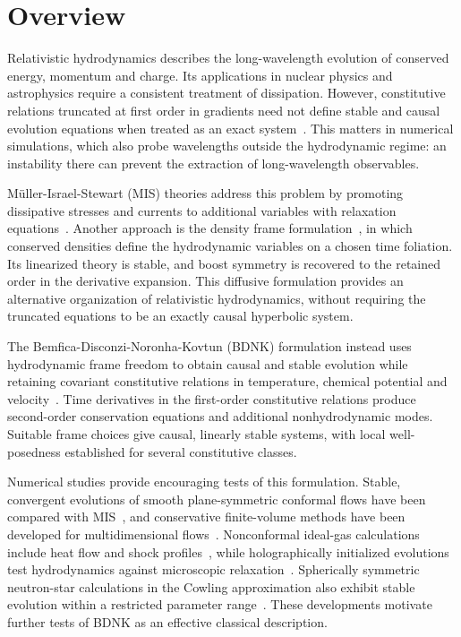 \section{Overview}\label{sec:overview}

Relativistic hydrodynamics describes the long-wavelength evolution of
conserved energy, momentum and charge. Its applications in nuclear physics
and astrophysics require a consistent treatment of dissipation. However,
constitutive relations truncated at first order in gradients need not
define stable and causal evolution equations when treated as an exact
system~\cite{HiscockLindblom}. This matters in numerical simulations, which also probe
wavelengths outside the hydrodynamic regime: an instability there can
prevent the extraction of long-wavelength observables.

M\"uller-Israel-Stewart (MIS) theories address this problem by promoting
dissipative stresses and currents to additional variables with relaxation
equations~\cite{Muller,IsraelStewart}. Another approach is the density frame
formulation~\cite{ArmasJain}, in which conserved densities define the
hydrodynamic variables on a chosen time foliation. Its linearized theory
is stable, and boost symmetry is recovered to the retained order in the
derivative expansion. This diffusive formulation provides an alternative
organization of relativistic hydrodynamics, without requiring the
truncated equations to be an exactly causal hyperbolic system.

The Bemfica-Disconzi-Noronha-Kovtun (BDNK) formulation instead uses
hydrodynamic frame freedom to obtain causal and stable evolution while
retaining covariant constitutive relations in temperature, chemical
potential and velocity~\cite{BDN2018,Kovtun2019,BDN2019,HoultKovtun,BDN2022}.
Time derivatives in the first-order constitutive relations produce
second-order conservation equations and additional nonhydrodynamic modes.
Suitable frame choices give causal, linearly stable systems, with local well-posedness established
for several constitutive classes.

Numerical studies provide encouraging tests of this formulation. Stable,
convergent evolutions of smooth plane-symmetric conformal flows have been
compared with MIS~\cite{PandyaPretorius}, and conservative finite-volume
methods have been developed for multidimensional flows~\cite{PandyaMostPretorius}.
Nonconformal ideal-gas calculations include heat flow and shock
profiles~\cite{PandyaIdealGas}, while holographically initialized
evolutions test hydrodynamics against microscopic
relaxation~\cite{BantilanBeaFigueras}. Spherically symmetric neutron-star
calculations in the Cowling approximation also exhibit stable evolution
within a restricted parameter range~\cite{ShumEtAl}. These developments motivate further tests of BDNK as an effective
classical description.

